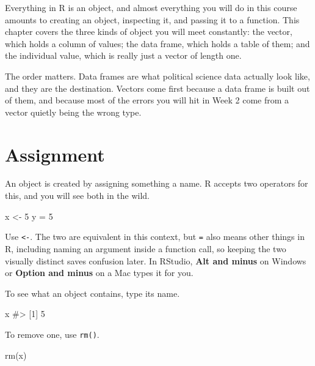 \documentclass[
  a4paper,
]{scrbook}
\newenvironment{Shaded}{\begin{snugshade}}{\end{snugshade}}
\newcommand{\CommentTok}[1]{\textcolor[rgb]{0.37,0.37,0.37}{#1}}
\newcommand{\DecValTok}[1]{\textcolor[rgb]{0.68,0.00,0.00}{#1}}
\newcommand{\FunctionTok}[1]{\textcolor[rgb]{0.28,0.35,0.67}{#1}}
\newcommand{\NormalTok}[1]{\textcolor[rgb]{0.00,0.23,0.31}{#1}}
\newcommand{\OtherTok}[1]{\textcolor[rgb]{0.00,0.23,0.31}{#1}}
\begin{document}
Everything in R is an object, and almost everything you will do in this
course amounts to creating an object, inspecting it, and passing it to a
function. This chapter covers the three kinds of object you will meet
constantly: the vector, which holds a column of values; the data frame,
which holds a table of them; and the individual value, which is really
just a vector of length one.

The order matters. Data frames are what political science data actually
look like, and they are the destination. Vectors come first because a
data frame is built out of them, and because most of the errors you will
hit in Week 2 come from a vector quietly being the wrong type.

\section*{Assignment}\label{assignment}


An object is created by assigning something a name. R accepts two
operators for this, and you will see both in the wild.

\begin{Shaded}
\begin{Highlighting}[]
\NormalTok{x }\OtherTok{\textless{}{-}} \DecValTok{5}
\NormalTok{y }\OtherTok{=} \DecValTok{5}
\end{Highlighting}
\end{Shaded}

Use \texttt{\textless{}-}. The two are equivalent in this context, but
\texttt{=} also means other things in R, including naming an argument
inside a function call, so keeping the two visually distinct saves
confusion later. In RStudio, \textbf{Alt and minus} on Windows or
\textbf{Option and minus} on a Mac types it for you.

To see what an object contains, type its name.

\begin{Shaded}
\begin{Highlighting}[]
\NormalTok{x}
\CommentTok{\#\textgreater{} [1] 5}
\end{Highlighting}
\end{Shaded}

To remove one, use \texttt{rm()}.

\begin{Shaded}
\begin{Highlighting}[]
\FunctionTok{rm}\NormalTok{(x)}
\end{Highlighting}
\end{Shaded}
\end{document}
